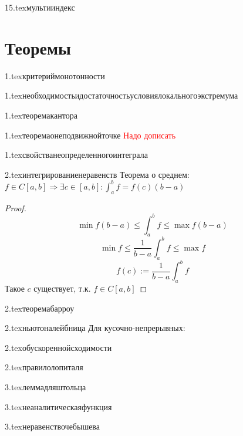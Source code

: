 {15.tex}{мультииндекс}

\section{Теоремы}

{1.tex}{критериймонотонности}

{1.tex}{необходимостьидостаточностьусловиялокальногоэкстремума}

{1.tex}{теоремакантора}

{1.tex}{теоремаонеподвижнойточке}
\textcolor{red}{Надо дописать}

{1.tex}{свойстванеопределенногоинтеграла}
\label{integralproperties}

{2.tex}{интегрированиенеравенств}
Теорема о среднем: $f\in C[a,b] \Rightarrow \exists c\in[a,b] : \int_a^b f = f(c)(b-a)$
\begin{proof}
    $$\min f(b-a)\le \int_a^b f \le \max f(b-a)$$
    $$\min f\le \frac{1}{b-a}\int_a^b f \le \max f$$
    $$f(c) := \frac{1}{b-a}\int_a^b f$$
    Такое $c$ существует, т.к. $f\in C[a,b]$
\end{proof}

{2.tex}{теоремабарроу}

{2.tex}{ньютоналейбница}
Для кусочно-непрерывных:\\

{2.tex}{обускореннойсходимости}

{2.tex}{правилолопиталя}

{3.tex}{леммадляштольца}

{3.tex}{неаналитическаяфункция}

{3.tex}{неравенствочебышева}


